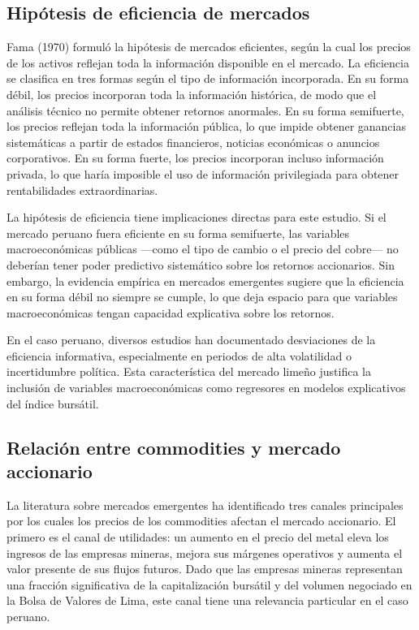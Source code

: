 \documentclass[12pt, a4paper]{article}
\begin{document}
\subsection{Hipótesis de eficiencia de mercados}

Fama (1970) formuló la hipótesis de mercados eficientes, según la cual los precios de los activos reflejan toda la información disponible en el mercado. La eficiencia se clasifica en tres formas según el tipo de información incorporada. En su forma débil, los precios incorporan toda la información histórica, de modo que el análisis técnico no permite obtener retornos anormales. En su forma semifuerte, los precios reflejan toda la información pública, lo que impide obtener ganancias sistemáticas a partir de estados financieros, noticias económicas o anuncios corporativos. En su forma fuerte, los precios incorporan incluso información privada, lo que haría imposible el uso de información privilegiada para obtener rentabilidades extraordinarias.

La hipótesis de eficiencia tiene implicaciones directas para este estudio. Si el mercado peruano fuera eficiente en su forma semifuerte, las variables macroeconómicas públicas ---como el tipo de cambio o el precio del cobre--- no deberían tener poder predictivo sistemático sobre los retornos accionarios. Sin embargo, la evidencia empírica en mercados emergentes sugiere que la eficiencia en su forma débil no siempre se cumple, lo que deja espacio para que variables macroeconómicas tengan capacidad explicativa sobre los retornos.

En el caso peruano, diversos estudios han documentado desviaciones de la eficiencia informativa, especialmente en periodos de alta volatilidad o incertidumbre política. Esta característica del mercado limeño justifica la inclusión de variables macroeconómicas como regresores en modelos explicativos del índice bursátil.

\subsection{Relación entre commodities y mercado accionario}

La literatura sobre mercados emergentes ha identificado tres canales principales por los cuales los precios de los commodities afectan el mercado accionario. El primero es el canal de utilidades: un aumento en el precio del metal eleva los ingresos de las empresas mineras, mejora sus márgenes operativos y aumenta el valor presente de sus flujos futuros. Dado que las empresas mineras representan una fracción significativa de la capitalización bursátil y del volumen negociado en la Bolsa de Valores de Lima, este canal tiene una relevancia particular en el caso peruano.
\end{document}
